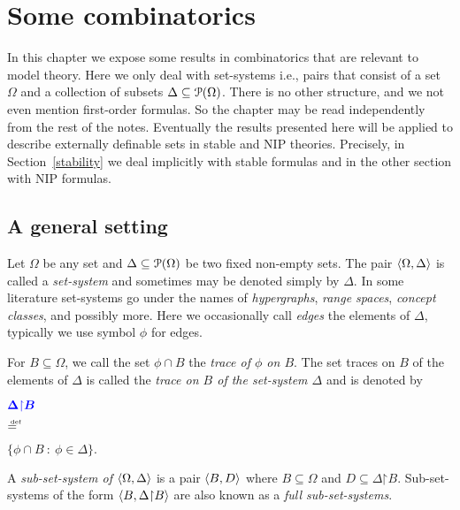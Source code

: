 \documentclass[creche.tex]{subfiles}
\begin{document}
\chapter{Some combinatorics}
\label{combinatorics}

\def\vc{{\footnotesize VC}}
\def\nip{{\footnotesize NIP}}


\def\medrel#1{\parbox[t]{6ex}{$\displaystyle\hfil #1$}}
\def\ceq#1#2#3{\parbox[t]{25ex}{$\displaystyle #1$}\medrel{#2}{$\displaystyle #3$}}

\def\mr{\color{brown}}
\def\gr{\color{green}}

In this chapter we expose some results in combinatorics that are relevant to model theory. Here we only deal with set-systems i.e., pairs that consist of a set $\Omega$ and a collection of subsets $\Delta\subseteq \P(\Omega)$. There is no other structure, and we not even mention first-order formulas. So the chapter may be read independently from the rest of the notes. Eventually the results presented here will be applied to describe externally definable sets in stable and \nip{} theories. Precisely, in Section~\ref{stability} we deal implicitly with stable formulas and in the other section with \nip{} formulas.


\section{A general setting}\label{theme}

Let $\Omega$ be any set and $\Delta\subseteq \P(\Omega)$ be two fixed non-empty sets. The pair $\<\Omega,\Delta\>$ is called a \emph{set-system} and sometimes may be denoted simply by $\Delta$. In some literature set-systems go under the names of \textit{hypergraphs}, \textit{range spaces}, \textit{concept classes}, and possibly more. Here we occasionally call \emph{edges} the elements of $\Delta$, typically we use symbol $\phi$ for edges.

For $B\subseteq \Omega$, we call the set $\phi\cap B$ the \emph{trace of $\phi$ on $B$}. The set traces on $B$ of the elements of $\Delta$ is called the \emph{trace on $B$ of the set-system $\Delta$\/} and is denoted by

\ceq{\hfill\emph{$\Delta\mathord\restriction B$}}{\deq}{\big\{\phi\cap B\ :\ \phi\in\Delta\big\}.} 

A \emph{sub-set-system of $\<\Omega,\Delta\>$\/} is a pair $\<B,D\>$ where $B\subseteq\Omega$ and $D\subseteq\Delta\mathord\restriction B$.  Sub-set-systems of the form $\<B,\Delta\mathord\restriction B\>$ are also known as a \emph{full sub-set-systems}. %
\end{document}
